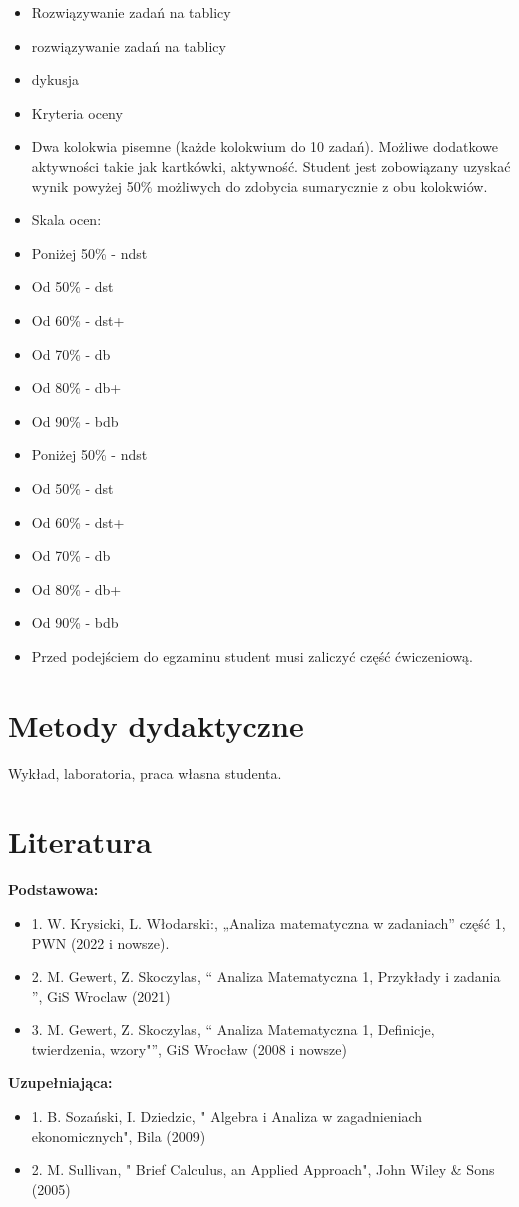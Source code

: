 \documentclass[12pt, a4paper]{article}
\begin{document}
\begin{itemize}
  \item Rozwiązywanie zadań na tablicy
  \item rozwiązywanie zadań na tablicy
  \item dykusja
  \item Kryteria oceny
  \item Dwa kolokwia pisemne (każde kolokwium do 10 zadań). Możliwe dodatkowe aktywności takie jak kartkówki, aktywność.  Student jest zobowiązany uzyskać wynik powyżej 50\% możliwych do zdobycia sumarycznie z obu kolokwiów.
  \item Skala ocen:
  \item Poniżej 50\% - ndst
  \item Od 50\% - dst
  \item Od 60\% - dst+
  \item Od 70\% - db
  \item Od 80\% - db+
  \item Od 90\% - bdb
  \item Poniżej 50\% - ndst
  \item Od 50\% - dst
  \item Od 60\% - dst+
  \item Od 70\% - db
  \item Od 80\% - db+
  \item Od 90\% - bdb
  \item Przed podejściem do egzaminu student musi zaliczyć część ćwiczeniową.
\end{itemize}

\section{Metody dydaktyczne}

Wykład, laboratoria, praca własna studenta.

\section{Literatura}

\textbf{Podstawowa:}
\begin{itemize}
  \item 1. W. Krysicki, L. Włodarski:, „Analiza matematyczna w zadaniach” część 1, PWN (2022 i nowsze).
  \item 2. M. Gewert, Z. Skoczylas, “ Analiza Matematyczna 1, Przykłady i zadania ”, GiS Wroclaw (2021)
  \item 3.  M. Gewert, Z. Skoczylas, “ Analiza Matematyczna 1, Definicje, twierdzenia, wzory"”, GiS Wrocław (2008 i nowsze)
\end{itemize}

\textbf{Uzupełniająca:}
\begin{itemize}
  \item 1. B. Sozański, I. Dziedzic, " Algebra i Analiza w zagadnieniach ekonomicznych", Bila (2009)
  \item 2.  M. Sullivan, " Brief  Calculus, an Applied Approach", John Wiley \& Sons (2005)
\end{itemize}
\end{document}
